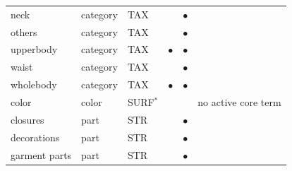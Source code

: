 {\begin{table}[htbp]
\begin{tabular}{@{}>{\raggedright\arraybackslash}p{}lllc>{\raggedright\arraybackslash}p{}@{}}
neck & category & TAX &  & $\bullet$ &  \\
others & category & TAX &  & $\bullet$ &  \\
upperbody & category & TAX & $\bullet$ & $\bullet$ &  \\
waist & category & TAX &  & $\bullet$ &  \\
wholebody & category & TAX & $\bullet$ & $\bullet$ &  \\
color & color & SURF$^\ast$ &  &  & no active core term \\
closures & part & STR &  & $\bullet$ &  \\
decorations & part & STR &  & $\bullet$ &  \\
garment parts & part & STR &  & $\bullet$ &  \\
\bottomrule
\end{tabular}
\end{table}}

